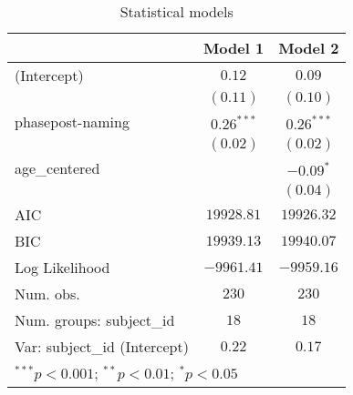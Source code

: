 
\begin{table}
\begin{center}
\begin{tabular}{l c c}
\hline
 & Model 1 & Model 2 \\
\hline
(Intercept)                  & $0.12$       & $0.09$       \\
                             & $(0.11)$     & $(0.10)$     \\
phasepost-naming             & $0.26^{***}$ & $0.26^{***}$ \\
                             & $(0.02)$     & $(0.02)$     \\
age\_centered                &              & $-0.09^{*}$  \\
                             &              & $(0.04)$     \\
\hline
AIC                          & $19928.81$   & $19926.32$   \\
BIC                          & $19939.13$   & $19940.07$   \\
Log Likelihood               & $-9961.41$   & $-9959.16$   \\
Num. obs.                    & $230$        & $230$        \\
Num. groups: subject\_id     & $18$         & $18$         \\
Var: subject\_id (Intercept) & $0.22$       & $0.17$       \\
\hline
\multicolumn{3}{l}{\scriptsize{$^{***}p<0.001$; $^{**}p<0.01$; $^{*}p<0.05$}}
\end{tabular}
\caption{Statistical models}
\label{table:coefficients}
\end{center}
\end{table}

